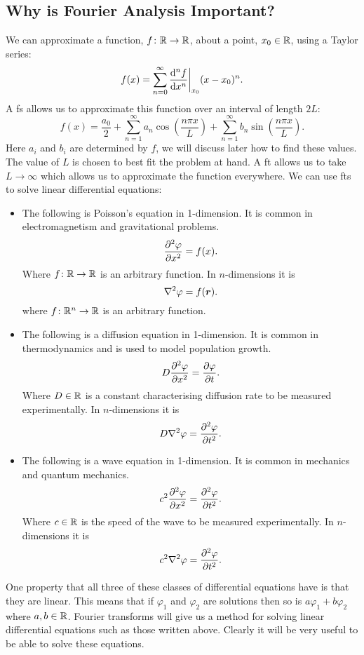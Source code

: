 \documentclass[a4paper]{article}
\begin{document}
    \subsection{Why is Fourier Analysis Important?}
    We can approximate a function, \(f\colon\mathbb{R}\to\mathbb{R}\), about a point, \(x_0\in\mathbb{R}\), using a Taylor series:
    \[f(x) = \sum_{n=0}^\infty \dv[n]{f}{x}\biggr|_{x_0}(x - x_0)^n.\]
    A \acrfull{fs} allows us to approximate this function over an interval of length \(2L\):
    \[f(x) = \frac{a_0}{2} + \sum_{n=1}^\infty a_n\cos\left(\frac{n\pi x}{L}\right) + \sum_{n=1}^\infty b_n\sin\left(\frac{n\pi x}{L}\right).\]
    Here \(a_i\) and \(b_i\) are determined by \(f\), we will discuss later how to find these values.
    The value of \(L\) is chosen to best fit the problem at hand.
    A \acrfull{ft} allows us to take \(L\to\infty\) which allows us to approximate the function everywhere.
    We can use \acrshort{ft}s to solve linear differential equations:
    \begin{itemize}
        \item The following is Poisson's equation in 1-dimension.
        It is common in electromagnetism and gravitational problems.
        \[\pdv[2]{\varphi}{x} = f(x).\]
        Where \(f\colon\mathbb{R}\to\mathbb{R}\) is an arbitrary function.
        In \(n\)-dimensions it is
        \[\nabla^2\varphi = f(\bm{r}).\]
        where \(f\colon\mathbb{R}^n\to\mathbb{R}\) is an arbitrary function.
        \item The following is a diffusion equation in 1-dimension.
        It is common in thermodynamics and is used to model population growth.
        \[D\pdv[2]{\varphi}{x} = \pdv{\varphi}{t}.\]
        Where \(D\in\mathbb{R}\) is a constant characterising diffusion rate to be measured experimentally.
        In \(n\)-dimensions it is
        \[D\nabla^2\varphi = \pdv[2]{\varphi}{t}.\]
        \item The following is a wave equation in 1-dimension.
        It is common in mechanics and quantum mechanics.
        \[c^2\pdv[2]{\varphi}{x} = \pdv[2]{\varphi}{t}.\]
        Where \(c\in\mathbb{R}\) is the speed of the wave to be measured experimentally.
        In \(n\)-dimensions it is
        \[c^2\nabla^2\varphi = \pdv[2]{\varphi}{t}.\]
    \end{itemize}
    One property that all three of these classes of differential equations have is that they are linear.
    This means that if \(\varphi_1\) and \(\varphi_2\) are solutions then so is \(a\varphi_1 + b\varphi_2\) where \(a, b\in\mathbb{R}\).
    Fourier transforms will give us a method for solving linear differential equations such as those written above.
    Clearly it will be very useful to be able to solve these equations.
    
\end{document}
